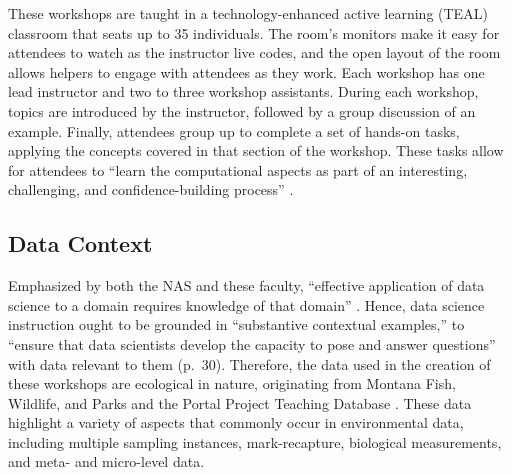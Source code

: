 \documentclass[12pt]{article}
\begin{document}
\quad These workshops are taught in a technology-enhanced active learning (TEAL)
classroom that seats up to 35 individuals. The room's monitors make it easy for 
attendees to watch as the instructor live codes, and the open layout of the room
allows helpers to engage with attendees as they work. Each workshop has one lead
instructor and two to three workshop assistants. During each workshop, topics
are introduced by the instructor, followed by a group discussion of an example. 
Finally, attendees group up to complete a set of hands-on tasks, applying the
concepts covered in that section of the workshop. These tasks allow for
attendees to ``learn the computational aspects as part of an interesting, 
challenging, and confidence-building process'' \citep[p. 101]{nolan}.

% 

\subsection{Data Context}  

\quad Emphasized by both the NAS and these faculty, ``effective application of
data science to a domain requires knowledge of that domain'' \citep[p.\ 29]{nas}. 
Hence, data science instruction ought to be grounded in ``substantive contextual
examples,'' to ``ensure that data scientists develop the capacity to pose and
answer questions'' with data relevant to them (p.\ 30). Therefore, the data used
in the creation of these workshops are ecological in nature, originating from
Montana Fish, Wildlife, and Parks and the Portal Project Teaching Database 
\citep{portal_data}. These data highlight a variety of aspects that commonly
occur in environmental data, including multiple sampling instances,
mark-recapture, biological measurements, and meta- and micro-level data. 

\end{document}
